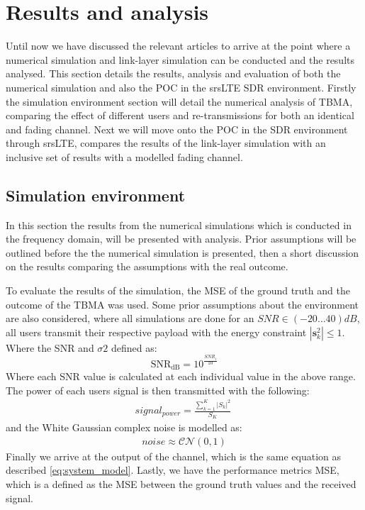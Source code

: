 \documentclass{article}
\begin{document}
 

\newpage
\section{Results and analysis}\label{sim_results}
Until now we have discussed the relevant articles to arrive at the point where a numerical simulation and link-layer simulation can be conducted and the results analysed. This section details the results, analysis and evaluation of both the numerical simulation and also the \ac{POC} in the srsLTE SDR environment. Firstly the simulation environment section will detail the numerical analysis of TBMA, comparing the effect of different users and re-transmissions for both an identical and fading channel. Next we will move onto the \ac{POC} in the SDR environment through srsLTE, compares the results of the link-layer simulation with an inclusive set of results with a modelled fading channel. 

\subsection{Simulation environment}
In this section the results from the numerical simulations which is conducted in the frequency domain, will be presented with analysis. Prior assumptions will be outlined before the the numerical simulation is presented, then a short discussion on the results comparing the assumptions with the real outcome. 

To evaluate the results of the simulation, the \ac{MSE} of the ground truth and the outcome of the TBMA was used. Some prior assumptions about the environment are also considered, where all simulations are done for an $SNR \in (-20\dots40)dB$, all users transmit their respective payload with the energy constraint  $|\textbf{s}_{k}^2| \leq 1$.  
Where the SNR and $\sigma2$ defined as:
\begin{equation} 
\text{SNR}_{\text{dB}} = 10^{\frac{SNR_{i}}{10}}    
\end{equation}
Where each SNR value is calculated at each individual value in the above range. The power of each users signal is then transmitted with the following:
\begin{align}
    signal_{power} = \frac{\sum\limits_{k=1}^{K}|S_{k}|^2 }{S_{K}} \     
\end{align}
and the White Gaussian complex noise is modelled as:
\begin{align}
    noise \approx \mathcal{CN}(0,1)
\end{align}
Finally we arrive at the output of the channel, which is the same equation as described \cref{eq:system_model}. Lastly, we have the performance metrics MSE, which is a defined as the MSE between the ground truth values and the received signal.
\end{document}
